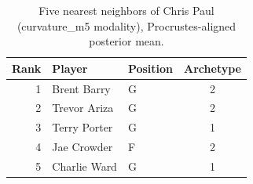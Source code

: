 \begin{table}[htbp]
  \centering\small
  \begin{tabular}{rllc}
    \toprule
    Rank & Player & Position & Archetype \\
    \midrule
    1 & Brent Barry & G & 2 \\
    2 & Trevor Ariza & G & 2 \\
    3 & Terry Porter & G & 1 \\
    4 & Jae Crowder & F & 2 \\
    5 & Charlie Ward & G & 1 \\
    \bottomrule
  \end{tabular}
  \caption{Five nearest neighbors of Chris Paul (curvature_m5 modality), Procrustes-aligned posterior mean.}
  \label{tab:Chris_Paul_neighbors_curvature_m5}
\end{table}


